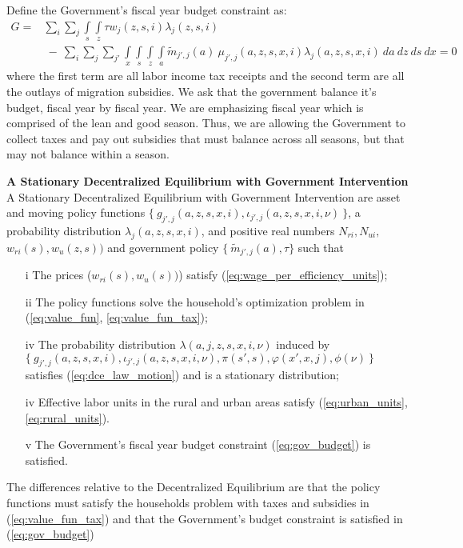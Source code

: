 \documentclass[12pt,pdftex]{article}
\begin{document}
\begin{onehalfspacing}
Define the Government's fiscal year budget constraint as:
{\small
\begin{align}
G =& \sum_{i} \sum_{j} \int\limits_{s} \int\limits_{z} \tau  w_{j}(z,s,i)\lambda_j(z,s,i)  \nonumber \\
& \ - \ \sum_{i} \sum_{j}\sum_{j'} \int\limits_{x} \int\limits_{s} \int\limits_{z} \int\limits_{a} \tilde{m}_{j',j}(a) \ \mu_{j',j}(a, z, s, x, i) \lambda_j(a, z, s, x, i) \ da \ dz \ ds \ dx  = 0
\label{eq:gov_budget}
\end{align}}
where the first term are all labor income tax receipts and the second term are all the outlays of migration subsidies. We ask that the government balance it's budget, fiscal year by fiscal year. We are emphasizing fiscal year which is comprised of the lean and good season. Thus, we are allowing the Government to collect taxes and pay out subsidies that must balance across all seasons, but that may not balance within a season.

\textbf{A Stationary Decentralized Equilibrium with Government Intervention} A Stationary Decentralized Equilibrium with Government Intervention are asset and moving policy functions $\{\ g_{j',j}(a, z, s, x, i), \iota_{j',j}(a, z, s, x, i, \nu) \ \}$, a probability distribution $\lambda_{j}(a, z, s, x, i)$, and positive real numbers $N_{ri}, N_{ui},$ $w_{ri}(s), w_{u}(z, s))$ and government policy $\{\ \tilde{m}_{j',j}(a), \tau\}$ such that
\begin{itemize}
\vspace{-.4cm}
\item[i] The prices ($w_{ri}(s), w_{u}(s))$) satisfy (\ref{eq:wage_per_efficiency_units});
\item[ii] The policy functions solve the household's optimization problem in (\ref{eq:value_fun}, \ref{eq:value_fun_tax});
\item[iv] The probability distribution $\lambda(a, j, z, s, x, i, \nu)$ induced by \\
$\{\ g_{j',j}(a, z, s, x, i), \iota_{j',j}(a, z, s, x, i, \nu), \pi(s',s), \varphi(x',x,j), \phi(\nu) \ \}$ satisfies (\ref{eq:dce_law_motion}) and is a stationary distribution;
\item[iv] Effective labor units in the rural and urban areas satisfy (\ref{eq:urban_units}, \ref{eq:rural_units}).
\item[v] The Government's fiscal year budget constraint (\ref{eq:gov_budget}) is satisfied.
\end{itemize}
The differences relative to the Decentralized Equilibrium are that the policy functions must satisfy the households problem with taxes and subsidies in (\ref{eq:value_fun_tax}) and that the Government's budget constraint is satisfied in (\ref{eq:gov_budget})


\end{onehalfspacing}
\end{document}

